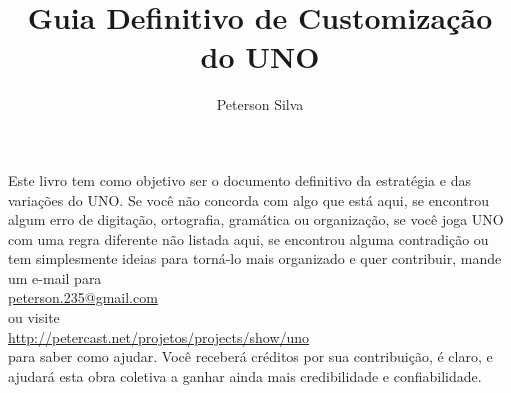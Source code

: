 \documentclass[a5paper,10pt]{book}
\title{Guia Definitivo de Customização do UNO}
\author{Peterson Silva}
\date{}
\begin{document}
\maketitle




\tableofcontents













\newpage

\vspace{5cm}

\begin{center}
\begin{small}
Este livro tem como objetivo ser o documento definitivo da estratégia e das variações do UNO. Se você não concorda com algo que está aqui, se encontrou algum erro de digitação, ortografia, gramática ou organização, se você joga UNO com uma regra diferente não listada aqui, se encontrou alguma contradição ou tem simplesmente ideias para torná-lo mais organizado e quer contribuir, mande um e-mail para \\

\href{mailto:peterson.235@gmail.com}{peterson.235@gmail.com} \\

ou visite \\

\url{http://petercast.net/projetos/projects/show/uno} \\

para saber como ajudar. Você receberá créditos por sua contribuição, é claro, e ajudará esta obra coletiva a ganhar ainda mais credibilidade e confiabilidade.
\end{small}
\end{center}
\end{document}
